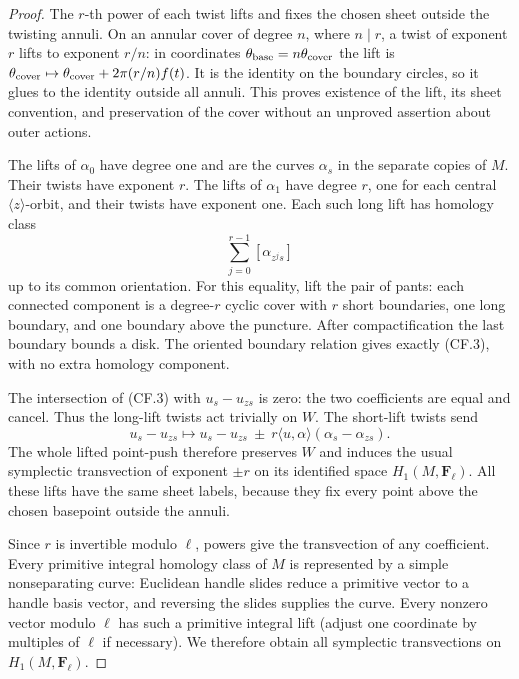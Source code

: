 \documentclass[11pt,a4paper]{article}
\newcommand{\F}{\mathbf F}
\begin{document}
\begin{proof}
The $r$-th power of each twist lifts and fixes the chosen sheet
outside the twisting annuli. On an annular cover of degree $n$,
where $n\mid r$, a twist of exponent $r$ lifts to exponent $r/n$:
in coordinates $\theta_{\rm base}=n\theta_{\rm cover}$ the lift is
$\theta_{\rm cover}\mapsto\theta_{\rm cover}+2\pi(r/n)f(t)$.
It is the identity on the boundary circles, so it glues to the
identity outside all annuli. This proves existence of the lift,
its sheet convention, and preservation of the cover without an
unproved assertion about outer actions.

The lifts of $\alpha_0$ have degree one and are the curves
$\alpha_s$ in the separate copies of $M$. Their twists have
exponent $r$. The lifts of $\alpha_1$ have degree $r$, one for
each central $\langle z\rangle$-orbit, and their twists have
exponent one. Each such long lift has homology class
\[
                        \sum_{j=0}^{r-1}[\alpha_{z^j s}]
                                                               \tag{CF.3}
\]
up to its common orientation. For this equality, lift the pair of
pants: each connected component is a degree-$r$ cyclic cover with
$r$ short boundaries, one long boundary, and one boundary above the
puncture. After compactification the last boundary bounds a disk.
The oriented boundary relation gives exactly (CF.3), with no extra
homology component.

The intersection of (CF.3) with $u_s-u_{zs}$ is zero: the two
coefficients are equal and cancel. Thus the long-lift twists act
trivially on $W$. The short-lift twists send
\[
 u_s-u_{zs}\longmapsto
 u_s-u_{zs}\ \mathbin{\pm}\ r\langle u,\alpha\rangle
                          (\alpha_s-\alpha_{zs}).              \tag{CF.4}
\]
The whole lifted point-push therefore preserves $W$ and induces the
usual symplectic transvection of exponent $\pm r$ on its identified
space $H_1(M,\F_\ell)$. All these lifts have the same sheet labels,
because they fix every point above the chosen basepoint outside the
annuli.

Since $r$ is invertible modulo $\ell$, powers give the transvection
of any coefficient. Every primitive integral homology class of $M$
is represented by a simple nonseparating curve: Euclidean handle
slides reduce a primitive vector to a handle basis vector, and
reversing the slides supplies the curve. Every nonzero vector modulo
$\ell$ has such a primitive integral lift (adjust one coordinate
by multiples of $\ell$ if necessary). We therefore obtain all
symplectic transvections on $H_1(M,\F_\ell)$.


\end{proof}
\end{document}
